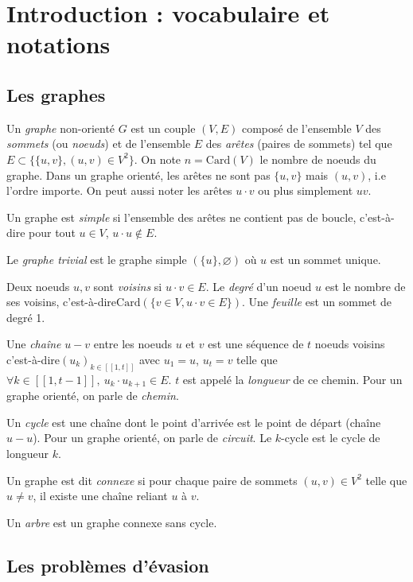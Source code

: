 \documentclass[12pt]{article}
\newcommand{\card}[1]{\text{Card}(#1)}
\newcommand{\inN}[2]{\in[\![#1,#2]\!]}
\newcommand{\cad}{c'est-à-dire\xspace}
\begin{document}
\tableofcontents

\section{Introduction : vocabulaire et notations}

\subsection{Les graphes}
Un \emph{graphe} non-orienté $G$ est un couple $(V,E)$ composé de l'ensemble $V$ des \emph{sommets} (ou \emph{noeuds}) et de l'ensemble $E$ des \emph{arêtes} (paires de sommets) tel que $E \subset \{\{u,v\}, (u,v)\in V^2\}$. On note $n=\card{V}$ le nombre de noeuds du graphe. Dans un graphe orienté, les arêtes ne sont pas $\{u,v\}$ mais $(u,v)$, i.e l'ordre importe. On peut aussi noter les arêtes $u \cdot v$ ou plus simplement $uv$.

Un graphe est \emph{simple} si l'ensemble des arêtes ne contient pas de boucle, \cad pour tout $u\in V$, $u \cdot u \notin E$.

Le \emph{graphe trivial} est le graphe simple $(\{u\},\varnothing)$ où $u$ est un sommet unique.

Deux noeuds $u,v$ sont \emph{voisins} si $u\cdot v \in E$. Le \emph{degré} d'un noeud $u$ est le nombre de ses voisins, \cad $\card{\{v\in V, u \cdot v \in E\}}$. Une \emph{feuille} est un sommet de degré 1.

Une \emph{chaîne} $u-v$ entre les noeuds $u$ et $v$ est une séquence de $t$ noeuds voisins \cad $(u_k)_{k\inN{1}{t}}$ avec $u_1=u$, $u_t=v$ telle que $\forall k\inN{1}{t-1},\ u_{k} \cdot u_{k+1} \in E$. $t$ est appelé la \emph{longueur} de ce chemin. Pour un graphe orienté, on parle de \emph{chemin}.

Un \emph{cycle} est une chaîne dont le point d'arrivée est le point de départ (chaîne $u-u$). Pour un graphe orienté, on parle de \emph{circuit}. Le $k$-cycle est le cycle de longueur $k$.

Un graphe est dit \emph{connexe} si pour chaque paire de sommets $(u,v) \in V^2$ telle que $u \neq v$, il existe une chaîne reliant $u$ à $v$.

Un \emph{arbre} est un graphe connexe sans cycle.

\subsection{Les problèmes d'évasion}
\end{document}
